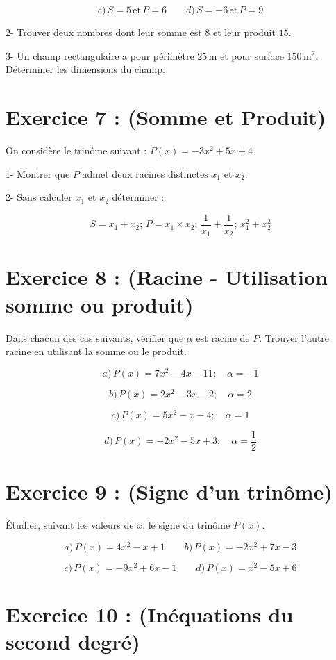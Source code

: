 \documentclass[12pt]{article}
\begin{document}
\[
c) \, S = 5 \, \text{et} \, P = 6 \quad\quad d) \, S = -6 \, \text{et} \, P = 9
\]

2- Trouver deux nombres dont leur somme est \( 8 \) et leur produit \( 15 \).

3- Un champ rectangulaire a pour périmètre \( 25 \, \text{m} \) et pour surface \( 150 \, \text{m}^2 \). Déterminer les dimensions du champ.

\section*{Exercice 7 : (Somme et Produit)}

On considère le trinôme suivant : \( P(x) = -3x^2 + 5x + 4 \)

1- Montrer que \( P \) admet deux racines distinctes \( x_1 \) et \( x_2 \).

2- Sans calculer \( x_1 \) et \( x_2 \) déterminer :

\[
S = x_1 + x_2 ; \, P = x_1 \times x_2 ; \, \frac{1}{x_1} + \frac{1}{x_2} ; \, x_1^2 + x_2^2
\]

\section*{Exercice 8 : (Racine - Utilisation somme ou produit)}

Dans chacun des cas suivants, vérifier que \( \alpha \) est racine de \( P \). Trouver l’autre racine en utilisant la somme ou le produit.

\[
a) \, P(x) = 7x^2 - 4x - 11 ; \quad \alpha = -1
\]

\[
b) \, P(x) = 2x^2 - 3x - 2 ; \quad \alpha = 2
\]

\[
c) \, P(x) = 5x^2 - x - 4 ; \quad \alpha = 1
\]

\[
d) \, P(x) = -2x^2 - 5x + 3 ; \quad \alpha = \frac{1}{2}
\]

\section*{Exercice 9 : (Signe d’un trinôme)}

Étudier, suivant les valeurs de \( x \), le signe du trinôme \( P(x) \).

\[
a) \, P(x) = 4x^2 - x + 1 \quad\quad b) \, P(x) = -2x^2 + 7x - 3
\]

\[
c) \, P(x) = -9x^2 + 6x - 1 \quad\quad d) \, P(x) = x^2 - 5x + 6
\]

\section*{Exercice 10 : (Inéquations du second degré)}
\end{document}
